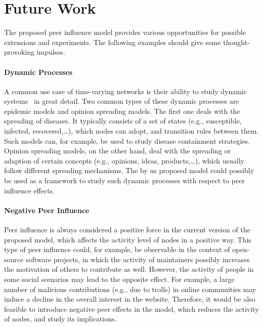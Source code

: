 

\section{Future Work}
\label{sec:future-work}

The proposed peer influence model provides various opportunities for possible extensions and experiments.
The following examples should give some thought-provoking impulses.

\paragraph{Dynamic Processes}
A common use case of time-varying networks is their ability to study dynamic systems~\cite{Holme2015} in great detail.
Two common types of these dynamic processes are epidemic models and opinion spreading models.
The first one deals with the spreading of diseases.
It typically consists of a set of states (e.g., susceptible, infected, recovered,\ldots), which nodes can adopt, and transition rules between them.
Such models can, for example, be used to study disease containment strategies.
Opinion spreading models, on the other hand, deal with the spreading or adaption of certain concepts (e.g., opinions, ideas, products,\ldots), which usually follow different spreading mechanisms.
The by us proposed model could possibly be used as a framework to study such dynamic processes with respect to peer influence effects.

\paragraph{Negative Peer Influence}
Peer influence is always considered a positive force in the current version of the proposed model, which affects the activity level of nodes in a positive way.
This type of peer influence could, for example, be observable in the context of open-source software projects, in which the activity of maintainers possibly increases the motivation of others to contribute as well.
However, the activity of people in some social scenarios may lead to the opposite effect.
For example, a large number of malicious contributions (e.g., due to trolls) in online communities may induce a decline in the overall interest in the website.
Therefore, it would be also feasible to introduce negative peer effects in the model, which reduces the activity of nodes, and study its implications.

